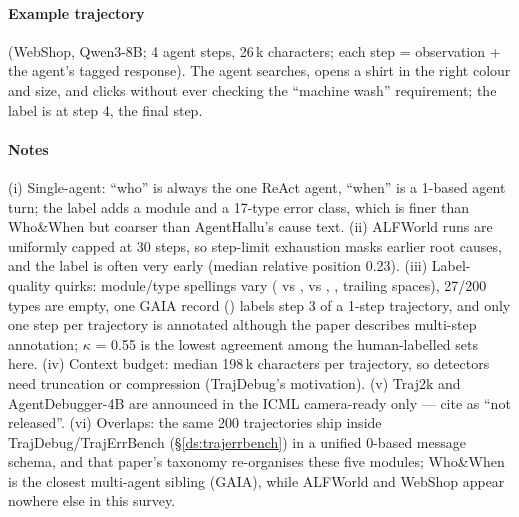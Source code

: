 \paragraph{Example trajectory}  (WebShop, Qwen3-8B; 4 agent steps, 26\,k characters; each step = observation + the agent's tagged response). The agent searches, opens a shirt in the right colour and size, and clicks  without ever checking the ``machine wash'' requirement; the label is  at step 4, the final step.


\paragraph{Notes} (i) Single-agent: ``who'' is always the one ReAct agent, ``when'' is a 1-based agent turn; the label adds a module and a 17-type error class, which is finer than Who\&When but coarser than AgentHallu's cause text. (ii) ALFWorld runs are uniformly capped at 30 steps, so step-limit exhaustion masks earlier root causes, and the label is often very early (median relative position 0.23). (iii) Label-quality quirks: module/type spellings vary ( vs ,  vs , , trailing spaces), 27/200 types are empty, one GAIA record () labels step 3 of a 1-step trajectory, and only one step per trajectory is annotated although the paper describes multi-step annotation; $\kappa$ = 0.55 is the lowest agreement among the human-labelled sets here. (iv) Context budget: median 198\,k characters per trajectory, so detectors need truncation or compression (TrajDebug's motivation). (v) Traj2k and AgentDebugger-4B are announced in the ICML camera-ready only --- cite as ``not released''. (vi) Overlaps: the same 200 trajectories ship inside TrajDebug/TrajErrBench (\S\ref{ds:trajerrbench}) in a unified 0-based message schema, and that paper's taxonomy re-organises these five modules; Who\&When is the closest multi-agent sibling (GAIA), while ALFWorld and WebShop appear nowhere else in this survey.

